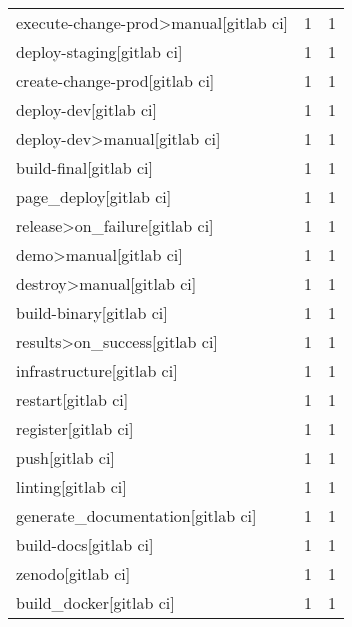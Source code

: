 \begin{tabular}{lrr}
execute-change-prod>manual[gitlab ci]      &                   1 &             1 \\
deploy-staging[gitlab ci]                  &                   1 &             1 \\
create-change-prod[gitlab ci]              &                   1 &             1 \\
deploy-dev[gitlab ci]                      &                   1 &             1 \\
deploy-dev>manual[gitlab ci]               &                   1 &             1 \\
build-final[gitlab ci]                     &                   1 &             1 \\
page\_deploy[gitlab ci]                     &                   1 &             1 \\
release>on\_failure[gitlab ci]              &                   1 &             1 \\
demo>manual[gitlab ci]                     &                   1 &             1 \\
destroy>manual[gitlab ci]                  &                   1 &             1 \\
build-binary[gitlab ci]                    &                   1 &             1 \\
results>on\_success[gitlab ci]              &                   1 &             1 \\
infrastructure[gitlab ci]                  &                   1 &             1 \\
restart[gitlab ci]                         &                   1 &             1 \\
register[gitlab ci]                        &                   1 &             1 \\
push[gitlab ci]                            &                   1 &             1 \\
linting[gitlab ci]                         &                   1 &             1 \\
generate\_documentation[gitlab ci]          &                   1 &             1 \\
build-docs[gitlab ci]                      &                   1 &             1 \\
zenodo[gitlab ci]                          &                   1 &             1 \\
build\_docker[gitlab ci]                    &                   1 &             1 \\

\end{tabular}
